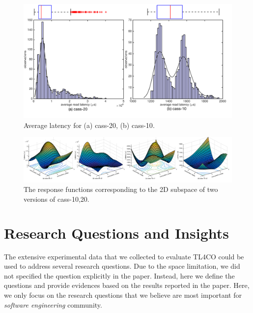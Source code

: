 \documentclass[letter]{vldb}
\begin{document}
\begin{figure}[h!]
	\begin{center}
		\includegraphics[width=1.1\columnwidth]{figures/109-138-read-hist-boxplot}
		\caption{Average latency for (a) {\sf cass-20}, (b) {\sf cass-10}.}
		\label{fig:read-latency-hist}
	\end{center}
\end{figure}

\begin{figure}[t]
	\begin{center}
		\includegraphics[width=\textwidth]{figures/cass-surfaces-all}
		\caption{The response functions corresponding to the {\sf 2D} subspace of two versions of {\sf cass-10,20}.}
		\label{fig:cass-surf-all}
	\end{center}
\end{figure}




\newpage
\section{Research Questions and Insights}

The extensive experimental data that we collected to evaluate {\sf TL4CO} could be used to address several research questions. Due to the space limitation, we did not specified the question explicitly in the paper. Instead, here we define the questions and provide evidences based on the results reported in the paper. Here, we only focus on the research questions that we believe are most important for \emph{software engineering} community.
\end{document}
